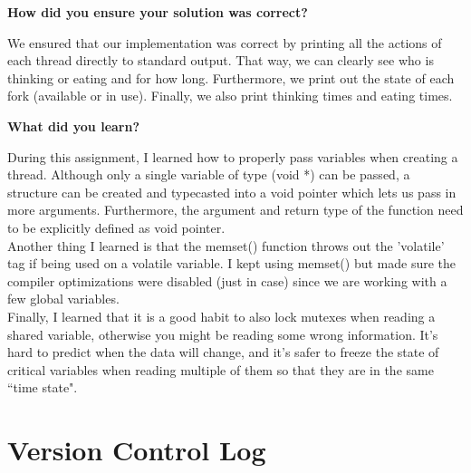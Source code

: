 \documentclass[10pt,letterpaper,draftclsnofoot,onecolumn]{IEEEtran}
\begin{document}
\noindent\textbf{How did you ensure your solution was correct?}
\medskip

\noindent We ensured that our implementation was correct by printing all the actions of each thread directly to standard output. That way, we can clearly see who is thinking or eating and for how long. Furthermore, we print out the state of each fork (available or in use). Finally, we also print thinking times and eating times.\\
\medskip

\bigskip

\noindent\textbf{What did you learn?}
\medskip

\noindent During this assignment, I learned how to properly pass variables when creating a thread. Although only a single variable of type (void *) can be passed, a structure can be created and typecasted into a void pointer which lets us pass in more arguments.  Furthermore, the argument and return type of the function need to be explicitly defined as void pointer.\\
\noindent Another thing I learned is that the memset() function throws out the 'volatile' tag if being used on a volatile variable. I kept using memset() but made sure the compiler optimizations were disabled (just in case) since we are working with a few global variables.\\
\noindent Finally, I learned that it is a good habit to also lock mutexes when reading a shared variable, otherwise you might be reading some wrong information. It's hard to predict when the data will change, and it's safer to freeze the state of critical variables when reading multiple of them so that they are in the same ``time state".\\
\bigskip

\section{Version Control Log}
\bigskip
\end{document}
